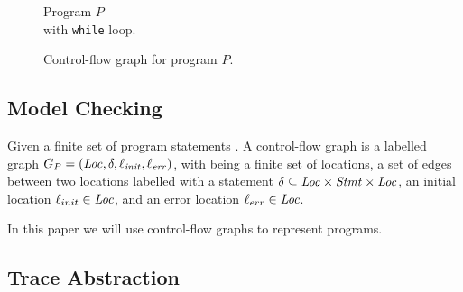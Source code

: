 \begin{comment}
	\begin{mydef}[Sets of Program States]
	To represent multiple program states we use first-order logic formulas. Given a first-order logic formula $\varphi$, defined over variables in $V$, we denote $\{\varphi\} = \{s \in \stateSpace | \eval{\varphi} \text{ where } \rho = s\}$
	\end{mydef}
\end{comment}


\begin{center}
	\begin{minipage}[b]{0.4\linewidth}
			\begin{figure}[H]
			\centering
			
			\caption{Program $P$ \\ with \texttt{while} loop.}
			\label{code}
		\end{figure}
	\end{minipage}
	\hfill
	\begin{minipage}[b]{0.59\linewidth}
		\begin{figure}[H]
			\centering
			
			\caption{Control-flow graph for program $P$.}
			\label{code}
		\end{figure}
	\end{minipage}
\end{center}


\subsection{Model Checking}
\begin{mydef}
	Given a finite set of program statements \stmt. A control-flow graph is a labelled graph $G_P = (\mathit{Loc}, \delta, \ell_{\mathit{init}}, \ell_{\mathit{err}})$, with
	\Loc being a finite set of locations,
	a set of edges between two locations labelled with a statement $\delta \subseteq \mathit{Loc} \times \mathit{Stmt} \times \mathit{Loc}$,
	an initial location $\ell_{init} \in \mathit{Loc}$, and
	an error location $\ell_{err} \in \mathit{Loc}$.
\end{mydef}
In this paper we will use control-flow graphs to represent programs.


\subsection{Trace Abstraction}